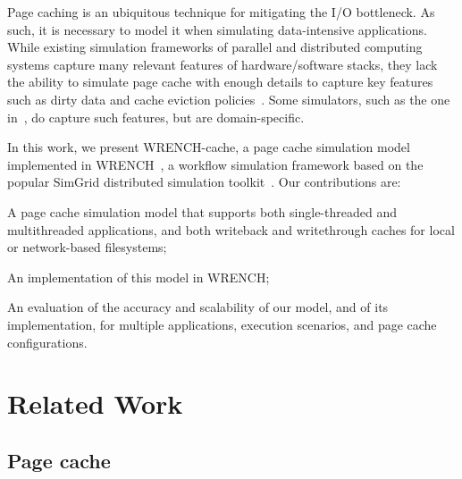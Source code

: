 \documentclass[conference]{IEEEtran}
\newcommand{\simgrid}{SimGrid\xspace}
\newcommand{\wrench}{WRENCH\xspace}
\begin{document}
        Page caching is an ubiquitous technique for mitigating the I/O bottleneck.
        As such, it is necessary to model it
        when simulating data-intensive applications.
        While existing simulation frameworks of parallel and distributed computing
        systems  capture many relevant features of hardware/software stacks, 
        they lack the ability to simulate page cache with enough details to capture key features such
        as dirty data and cache eviction policies~\cite{nunez2012simcan,nunez2012icancloud}. 
        Some simulators, such as the one in~\cite{xu2018saving}, do capture such features,
        but are domain-specific. 


    In this work, we present \wrench-cache, a page cache simulation model
    implemented in \wrench~\cite{casanova2020fgcs}, a workflow simulation
    framework based on the popular \simgrid distributed simulation
    toolkit~\cite{casanova2014simgrid}. Our contributions are:
    \begin{compactitem}
        \item A page cache simulation model that supports 
    both single-threaded and multithreaded applications, and both
    writeback and writethrough caches for local or network-based
    filesystems;
        \item An implementation of this model in \wrench; 
        \item An evaluation of the accuracy and scalability of our model, and of its implementation,
              for multiple applications, execution scenarios, and page cache configurations. 
    \end{compactitem}


    \section{Related Work}
    \label{relatedwork}

        \subsection{Page cache}
\end{document}
